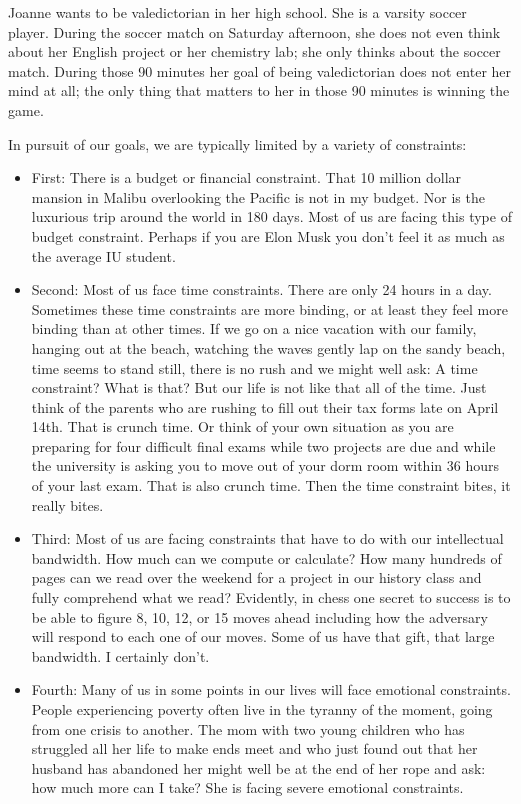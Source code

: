 \documentclass[
]{book}
\begin{document}
Joanne wants to be valedictorian in her high school. She is a varsity soccer player. During the soccer match on Saturday afternoon, she does not even think about her English project or her chemistry lab; she only thinks about the soccer match. During those 90 minutes her goal of being valedictorian does not enter her mind at all; the only thing that matters to her in those 90 minutes is winning the game.

In pursuit of our goals, we are typically limited by a variety of constraints:

\begin{itemize}
\item
  First: There is a budget or financial constraint. That 10 million dollar mansion in Malibu overlooking the Pacific is not in my budget. Nor is the luxurious trip around the world in 180 days. Most of us are facing this type of budget constraint. Perhaps if you are Elon Musk you don't feel it as much as the average IU student.
\item
  Second: Most of us face time constraints. There are only 24 hours in a day. Sometimes these time constraints are more binding, or at least they feel more binding than at other times. If we go on a nice vacation with our family, hanging out at the beach, watching the waves gently lap on the sandy beach, time seems to stand still, there is no rush and we might well ask: A time constraint? What is that? But our life is not like that all of the time. Just think of the parents who are rushing to fill out their tax forms late on April 14th. That is crunch time. Or think of your own situation as you are preparing for four difficult final exams while two projects are due and while the university is asking you to move out of your dorm room within 36 hours of your last exam. That is also crunch time. Then the time constraint bites, it really bites.
\item
  Third: Most of us are facing constraints that have to do with our intellectual bandwidth. How much can we compute or calculate? How many hundreds of pages can we read over the weekend for a project in our history class and fully comprehend what we read? Evidently, in chess one secret to success is to be able to figure 8, 10, 12, or 15 moves ahead including how the adversary will respond to each one of our moves. Some of us have that gift, that large bandwidth. I certainly don't.
\item
  Fourth: Many of us in some points in our lives will face emotional constraints. People experiencing poverty often live in the tyranny of the moment, going from one crisis to another. The mom with two young children who has struggled all her life to make ends meet and who just found out that her husband has abandoned her might well be at the end of her rope and ask: how much more can I take? She is facing severe emotional constraints.
\end{itemize}
\end{document}
